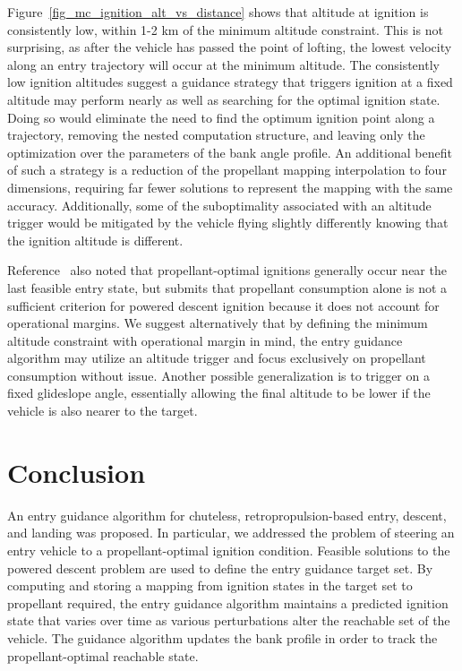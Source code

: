 \documentclass[letterpaper, paper,11pt]{AAS}
\begin{document}
Figure~\ref{fig_mc_ignition_alt_vs_distance} shows that altitude at ignition is consistently low, within 1-2 km of the minimum altitude constraint. This is not surprising, as after the vehicle has passed the point of lofting, the lowest velocity along an entry trajectory will occur at the minimum altitude.
The consistently low ignition altitudes suggest a guidance strategy that triggers ignition at a fixed altitude may perform nearly as well as searching for the optimal ignition state. Doing so would eliminate the need to find the optimum ignition point along a trajectory, removing the nested computation structure, and leaving only the optimization over the parameters of the bank angle profile. An additional benefit of such a strategy is a reduction of the propellant mapping interpolation to four dimensions, requiring far fewer solutions to represent the mapping with the same accuracy. Additionally, some of the suboptimality associated with an altitude trigger would be mitigated by the vehicle flying slightly differently knowing that the ignition altitude is different. 

Reference~\cite{PropellantOptimalAdaptiveTrigger} also noted that propellant-optimal ignitions generally occur near the last feasible entry state, but submits that propellant consumption alone is not a sufficient criterion for powered descent ignition because it does not account for operational margins. We suggest alternatively that by defining the minimum altitude constraint with operational margin in mind, the entry guidance algorithm may utilize an altitude trigger and focus exclusively on propellant consumption without issue. Another possible generalization is to trigger on a fixed glideslope angle, essentially allowing the final altitude to be lower if the vehicle is also nearer to the target.
 
\section{Conclusion}
An entry guidance algorithm for chuteless, retropropulsion-based entry, descent, and landing was proposed. In particular, we addressed the problem of steering an entry vehicle to a propellant-optimal ignition condition. Feasible solutions to the powered descent problem are used to define the entry guidance target set. By computing and storing a mapping from ignition states in the target set to propellant required, the entry guidance algorithm maintains a predicted ignition state that varies over time as various perturbations alter the reachable set of the vehicle. The guidance algorithm updates the bank profile in order to track the propellant-optimal reachable state.
\end{document}
